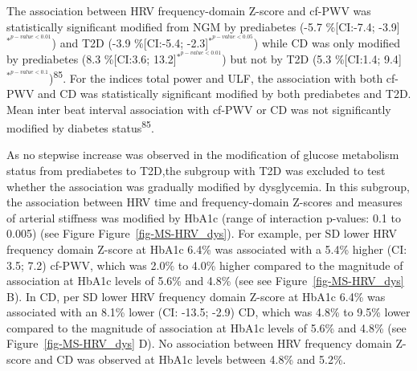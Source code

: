 \documentclass[
  a4paper,
  headsepline=true,
  open=left]{scrbook}
\begin{document}
The association between HRV frequency-domain Z-score and cf-PWV was
statistically significant modified from NGM by prediabetes (-5.7
\%{[}CI:-7.4; -3.9{]}\(^{*^{p-value< 0.01}}\)) and T2D (-3.9
\%{[}CI:-5.4; -2.3{]}\(^{*^{p-value< 0.05}}\)) while CD was only
modified by prediabetes (8.3 \%{[}CI:3.6;
13.2{]}\(^{*^{p-value< 0.01}}\)) but not by T2D (5.3 \%{[}CI:1.4;
9.4{]}\(^{*^{p-value< 0.1}}\))\textsuperscript{85}. For the indices
total power and ULF, the association with both cf-PWV and CD was
statistically significant modified by both prediabetes and T2D. Mean
inter beat interval association with cf-PWV or CD was not significantly
modified by diabetes status\textsuperscript{85}.

As no stepwise increase was observed in the modification of glucose
metabolism status from prediabetes to T2D,the subgroup with T2D was
excluded to test whether the association was gradually modified by
dysglycemia. In this subgroup, the association between HRV time and
frequency-domain Z-scores and measures of arterial stiffness was
modified by HbA1c (range of interaction p-values: 0.1 to 0.005) (see
Figure Figure~\ref{fig-MS-HRV_dys}). For example, per SD lower HRV
frequency domain Z-score at HbA1c 6.4\% was associated with a 5.4\%
higher (CI: 3.5; 7.2) cf-PWV, which was 2.0\% to 4.0\% higher compared
to the magnitude of association at HbA1c levels of 5.6\% and 4.8\% (see
see Figure~\ref{fig-MS-HRV_dys} B). In CD, per SD lower HRV frequency
domain Z-score at HbA1c 6.4\% was associated with an 8.1\% lower (CI:
-13.5; -2.9) CD, which was 4.8\% to 9.5\% lower compared to the
magnitude of association at HbA1c levels of 5.6\% and 4.8\% (see
Figure~\ref{fig-MS-HRV_dys} D). No association between HRV frequency
domain Z-score and CD was observed at HbA1c levels between 4.8\% and
5.2\%.

\end{document}
